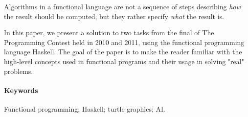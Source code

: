 \begin{adjustwidth}{1.5cm}{1.5cm}
Algorithms in a functional language are not a sequence of steps describing
\emph{how} the result should be computed, but they rather specify \emph{what}
the result is.

In this paper, we present a solution to two tasks from the final of The
Programming Contest held in 2010 and 2011, using the functional programming
language Haskell. The goal of the paper is to make the reader familiar with the
high-level concepts used in functional programs and their usage in solving
"real" problems.


\paragraph*{Keywords}
Functional programming; Haskell; turtle graphics; AI.

\end{adjustwidth}
